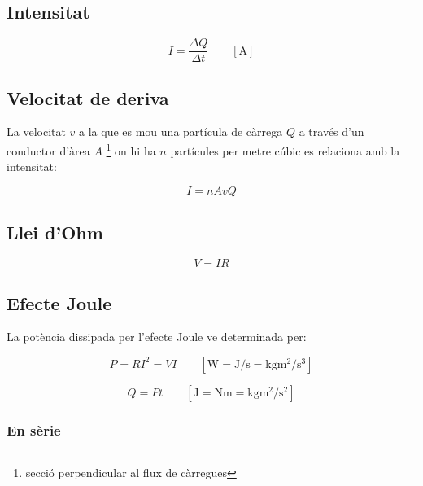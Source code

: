 \subsection{Intensitat}
\label{sub:intensitat}

\begin{equation}
    I = \frac{\Delta Q}{\Delta t} \qquad \left[\si{\ampere}\right]
\end{equation}

\subsection{Velocitat de deriva}
\label{sub:velocitat_de_deriva}
La velocitat $v$ a la que es mou una partícula de càrrega $Q$ a través d'un
conductor d'àrea $A$ \footnote{secció perpendicular al flux de càrregues} on
hi ha $n$ partícules per metre cúbic es relaciona amb la intensitat:

\begin{equation}
    I = nAvQ
\end{equation}

\subsection{Llei d'Ohm}
\label{sub:llei_d_ohm}

\begin{equation}
    V = IR
\end{equation}

\subsection{Efecte Joule}
\label{sub:efecte_joule}

La potència dissipada per l'efecte Joule ve determinada per:

\begin{equation}
    P = RI^2 = VI \qquad \left[ \si{\watt} =\si{\joule\per\second} = \si{\kilo\gram\metre\squared\per\second\cubed}\right]
\end{equation}

\begin{equation}
    Q = Pt \qquad \left[\si{\joule} = \si{\newton\metre} = \si{\kilo\gram\metre\squared\per\second\squared} \right]
\end{equation}


\subsubsection{En sèrie}
\label{ssub:en_serie_r}



